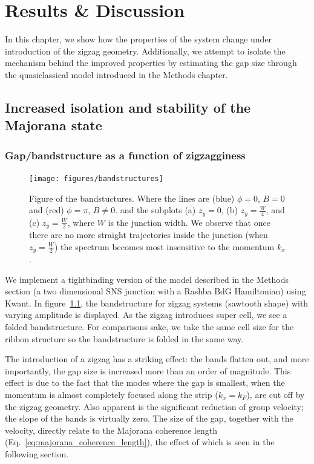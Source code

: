 \chapter{Results \& Discussion}
		In this chapter, we show how the properties of the system change under introduction of the zigzag geometry.
		Additionally, we attempt to isolate the mechanism behind the improved properties by estimating the gap size through the quasiclassical model introduced in the Methods chapter.
		
	\section{Increased isolation and stability of the Majorana state}

		\subsection{Gap/bandstructure as a function of zigzagginess}

			\begin{figure}[!htb]
			\centering
			\texttt{[image: figures/bandstructures]}
			\caption{Figure of the bandstuctures.
			Where the lines are (blue) $\phi=0$, $B=0$ and (red) $\phi=\pi$, $B \ne 0$.
			and the subplots (a) $z_y=0$, (b) $z_y=\frac{W}{4}$, and (c) $z_y=\frac{W}{2}$, where $W$ is the junction width.
			We observe that once there are no more straight trajectories inside the junction (when $z_y=\frac{W}{2}$) the spectrum becomes most insensitive to the momentum $k_x$.
			\label{fig:bandstuctures}}
			\end{figure}
			We implement a tightbinding version of the model described in the Methods section (a two dimensional SNS junction with a Rashba BdG Hamiltonian) using Kwant.
			In figure~\ref{fig:bandstuctures}, the bandstructure for zigzag systems (sawtooth shape) with varying amplitude is displayed.
			As the zigzag introduces super cell, we see a folded bandstructure.
			For comparisons sake, we take the same cell size for the ribbon structure so the bandstructure is folded in the same way.

			The introduction of a zigzag has a striking effect: the bands flatten out, and more importantly, the gap size is increased more than an order of magnitude.
			This effect is due to the fact that the modes where the gap is smallest, when the momentum is almost completely focused along the strip ($k_x=k_F$), are cut off by the zigzag geometry.
			Also apparent is the significant reduction of group velocity; the slope of the bands is virtually zero.
			The size of the gap, together with the velocity, directly relate to the Majorana coherence length (Eq.~\eqref{eq:majorana_coherence_length}), the effect of which is seen in the following section.


